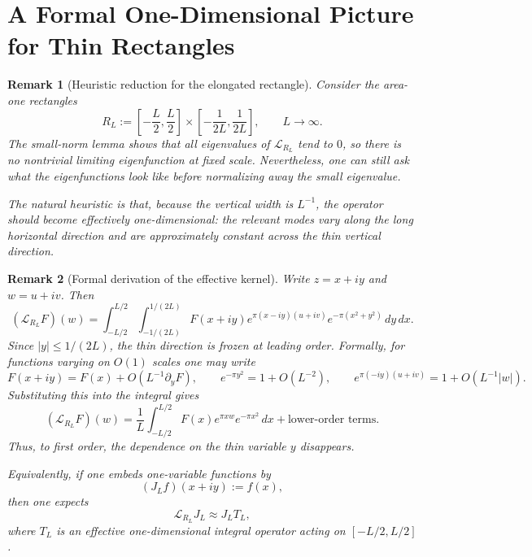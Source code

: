 \documentclass[a4paper,11pt,reqno]{amsart}
\newtheorem{remark}{Remark}[section]
\begin{document}
\section{A Formal One-Dimensional Picture for Thin Rectangles}

\begin{remark}[Heuristic reduction for the elongated rectangle]
Consider the area-one rectangles
\[
R_L:=
\left[-\frac L2,\frac L2\right]\times
\left[-\frac{1}{2L},\frac{1}{2L}\right],
\qquad L\to\infty.
\]
The small-norm lemma shows that all eigenvalues of $\mathcal L_{R_L}$ tend to
$0$, so there is no nontrivial limiting eigenfunction at fixed scale.
Nevertheless, one can still ask what the eigenfunctions \emph{look like} before
normalizing away the small eigenvalue.

The natural heuristic is that, because the vertical width is $L^{-1}$, the
operator should become effectively one-dimensional: the relevant modes vary
along the long horizontal direction and are approximately constant across the
thin vertical direction.
\end{remark}

\begin{remark}[Formal derivation of the effective kernel]
Write $z=x+iy$ and $w=u+iv$. Then
\[
(\mathcal L_{R_L}F)(w)
=
\int_{-L/2}^{L/2}\int_{-1/(2L)}^{1/(2L)}
F(x+iy)e^{\pi(x-iy)(u+iv)}e^{-\pi(x^2+y^2)}\,dy\,dx.
\]
Since $|y|\le 1/(2L)$, the thin direction is frozen at leading order. Formally,
for functions varying on $O(1)$ scales one may write
\[
F(x+iy)=F(x)+O(L^{-1}\partial_yF),
\qquad
e^{-\pi y^2}=1+O(L^{-2}),
\qquad
e^{\pi(-iy)(u+iv)}=1+O(L^{-1}|w|).
\]
Substituting this into the integral gives
\[
(\mathcal L_{R_L}F)(w)
=
\frac1L\int_{-L/2}^{L/2}F(x)e^{\pi xw}e^{-\pi x^2}\,dx
+\text{lower-order terms}.
\]
Thus, to first order, the dependence on the thin variable $y$ disappears.

Equivalently, if one embeds one-variable functions by
\[
(J_Lf)(x+iy):=f(x),
\]
then one expects
\[
\mathcal L_{R_L}J_L\approx J_LT_L,
\]
where $T_L$ is an effective one-dimensional integral operator acting on
$[-L/2,L/2]$.
\end{remark}
\end{document}
